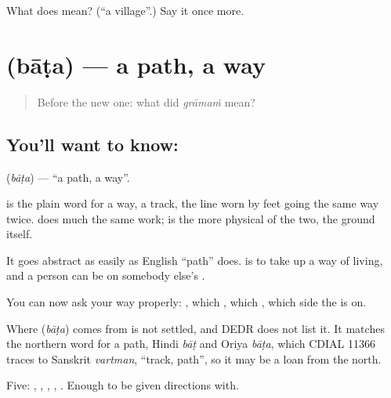 \begin{tcolorbox}[breakable,colback=teal!4,colframe=teal!35!black,title={Before you move on}]
What does  mean? (\textquotedblleft{}a village\textquotedblright{}.) Say it once more.
\end{tcolorbox}
\section[\texorpdfstring{\te{బాట} (bāṭa)}{బాట (bāṭa)}]{ (bāṭa) — a path, a way}

\label{lesson:TE-C55-path}



\begin{quote}
Before the new one: what did \emph{grāmaṁ} mean?
\end{quote}

\subsection*{You'll want to know: }
\textbf{} (\emph{bāṭa}) — \textquotedblleft{}a path, a way\textquotedblright{}.

 is the plain word for a way, a track, the line worn by feet going the same way twice.  does much the same work;  is the more physical of the two, the ground itself.

It goes abstract as easily as English \textquotedblleft{}path\textquotedblright{} does.   is to take up a way of living, and a person can be on somebody else's .

You can now ask your way properly: , which , which , which side the  is on.

\begin{cousinweb}
Where \textbf{} (\emph{bāṭa}) comes from is not settled, and DEDR does not list it. It matches the northern word for a path, Hindi \emph{bāṭ} and Oriya \emph{bāṭa}, which CDIAL 11366 traces to Sanskrit \emph{vartman}, \textquotedblleft{}track, path\textquotedblright{}, so it may be a loan from the north.
\end{cousinweb}

\begin{grammarlens}[title={What you've built}]
Five: , , , , . Enough to be given directions with.
\end{grammarlens}

